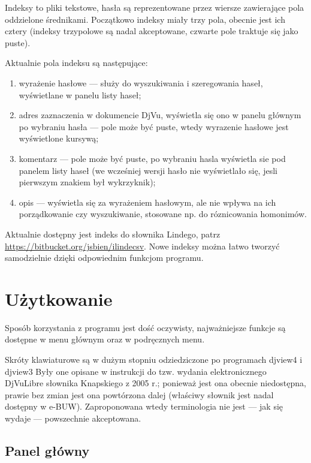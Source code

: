 \documentclass{mwart}
\begin{document}
Indeksy to pliki tekstowe, hasła są reprezentowane przez wiersze
zawierające pola oddzielone średnikami. Początkowo indeksy miały trzy
pola, obecnie jest ich cztery (indeksy trzypolowe są nadal
akceptowane, czwarte pole traktuje się jako puste).

Aktualnie pola indeksu są następujące:
\begin{enumerate}
\item wyrażenie hasłowe --- służy do wyszukiwania i szeregowania
  haseł, wyświetlane w panelu listy haseł;
\item adres zaznaczenia w dokumencie DjVu, wyświetla się ono w panelu
  głównym po wybraniu hasła --- pole może być puste, wtedy wyrazenie
  hasłowe jest wyświetlone kursywą;
\item komentarz --- pole może być puste, po wybraniu hasla wyświetla
  sie pod panelem listy haseł (we wcześniej wersji hasło nie
  wyświetlało się, jesli pierwszym znakiem był wykrzyknik);
\item opis --- wyświetla się za wyrażeniem hasłowym, ale nie wpływa na
  ich porządkowanie czy wyszukiwanie, stosowane np. do róznicowania
  homonimów.
\end{enumerate}

Aktualnie dostępny jest indeks do słownika Lindego, patrz
\url{https://bitbucket.org/jsbien/ilindecsv}. Nowe indeksy można łatwo
tworzyć samodzielnie dzięki odpowiednim funkcjom programu. 

\section{Użytkowanie}
\label{sec:uytkowanie}

Sposób korzystania z programu jest dość oczywisty, najważniejsze
funkcje są dostępne w menu głównym oraz w podręcznych menu.

Skróty klawiaturowe są w dużym stopniu odziedziczone po programach
\textsf{djview4} i \textsf{djview3} Były one opisane w instrukcji do
tzw. wydania elektronicznego DjVuLibre słownika Knapskiego z 2005 r.;
ponieważ jest ona obecnie niedostępna, prawie bez zmian jest ona
powtórzona dalej (właściwy słownik jest nadal dostępny w e-BUW).
Zaproponowana wtedy terminologia nie jest --- jak się wydaje ---
powszechnie akceptowana.

\subsection{Panel główny}
\label{sec:panel-gowny}
\end{document}
